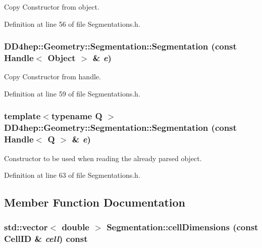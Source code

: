 Copy Constructor from object. 

Definition at line 56 of file Segmentations.h.\hypertarget{class_d_d4hep_1_1_geometry_1_1_segmentation_a52de777daf55b13d94eae2eb8f794b89}{
\subsubsection[{Segmentation}]{\setlength{\rightskip}{0pt plus 5cm}DD4hep::Geometry::Segmentation::Segmentation (const {\bf Handle}$<$ {\bf Object} $>$ \& {\em e})}}
\label{class_d_d4hep_1_1_geometry_1_1_segmentation_a52de777daf55b13d94eae2eb8f794b89}


Copy Constructor from handle. 

Definition at line 59 of file Segmentations.h.\hypertarget{class_d_d4hep_1_1_geometry_1_1_segmentation_ae96b3a9b6f30bb6694d0b0d6751adbca}{
\subsubsection[{Segmentation}]{\setlength{\rightskip}{0pt plus 5cm}template$<$typename Q $>$ DD4hep::Geometry::Segmentation::Segmentation (const {\bf Handle}$<$ Q $>$ \& {\em e})}}
\label{class_d_d4hep_1_1_geometry_1_1_segmentation_ae96b3a9b6f30bb6694d0b0d6751adbca}


Constructor to be used when reading the already parsed object. 

Definition at line 63 of file Segmentations.h.

\subsection{Member Function Documentation}
\hypertarget{class_d_d4hep_1_1_geometry_1_1_segmentation_a7512677d05495fef34e7f85f08fc4ad7}{
\subsubsection[{cellDimensions}]{\setlength{\rightskip}{0pt plus 5cm}std::vector$<$ double $>$ Segmentation::cellDimensions (const CellID \& {\em cell}) const}}
\label{class_d_d4hep_1_1_geometry_1_1_segmentation_a7512677d05495fef34e7f85f08fc4ad7}


